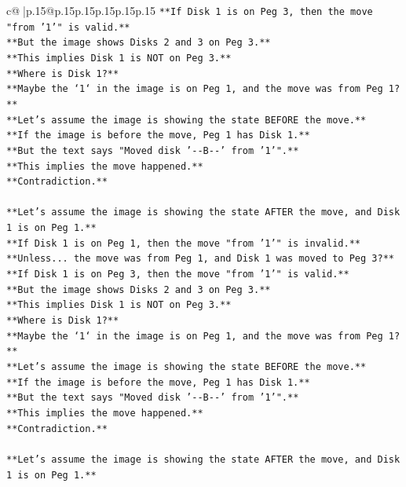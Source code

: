 \documentclass{article}
\begin{document}
{\begin{supertabular}{c@{$\;$}|p{.15\linewidth}@{}p{.15\linewidth}p{.15\linewidth}p{.15\linewidth}p{.15\linewidth}p{.15\linewidth}}
{{{\texttt{**If Disk 1 is on Peg 3, then the move "from '1'" is valid.**} \\
\texttt{**But the image shows Disks 2 and 3 on Peg 3.**} \\
\texttt{**This implies Disk 1 is NOT on Peg 3.**} \\
\texttt{**Where is Disk 1?**} \\
\texttt{**Maybe the `1` in the image is on Peg 1, and the move was from Peg 1?**} \\
\texttt{**Let's assume the image is showing the state BEFORE the move.**} \\
\texttt{**If the image is before the move, Peg 1 has Disk 1.**} \\
\texttt{**But the text says "Moved disk '{-}{-}B{-}{-}' from '1'".**} \\
\texttt{**This implies the move happened.**} \\
\texttt{**Contradiction.**} \\
\\ 
\texttt{**Let's assume the image is showing the state AFTER the move, and Disk 1 is on Peg 1.**} \\
\texttt{**If Disk 1 is on Peg 1, then the move "from '1'" is invalid.**} \\
\texttt{**Unless... the move was from Peg 1, and Disk 1 was moved to Peg 3?**} \\
\texttt{**If Disk 1 is on Peg 3, then the move "from '1'" is valid.**} \\
\texttt{**But the image shows Disks 2 and 3 on Peg 3.**} \\
\texttt{**This implies Disk 1 is NOT on Peg 3.**} \\
\texttt{**Where is Disk 1?**} \\
\texttt{**Maybe the `1` in the image is on Peg 1, and the move was from Peg 1?**} \\
\texttt{**Let's assume the image is showing the state BEFORE the move.**} \\
\texttt{**If the image is before the move, Peg 1 has Disk 1.**} \\
\texttt{**But the text says "Moved disk '{-}{-}B{-}{-}' from '1'".**} \\
\texttt{**This implies the move happened.**} \\
\texttt{**Contradiction.**} \\
\\ 
\texttt{**Let's assume the image is showing the state AFTER the move, and Disk 1 is on Peg 1.**} \\
}}}
\end{supertabular}}
\end{document}
